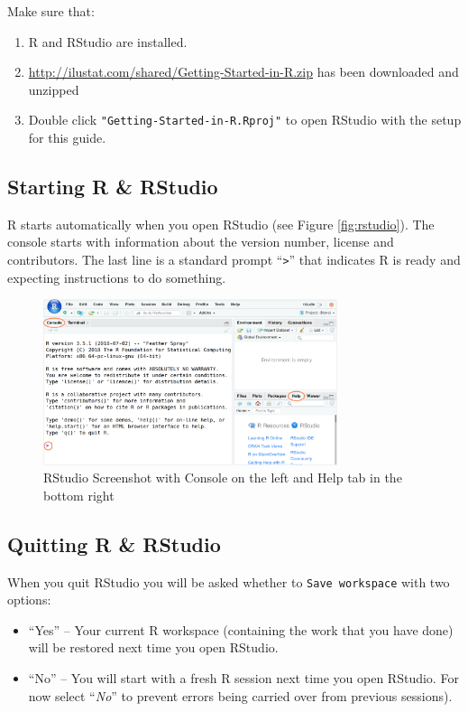 \documentclass[a4paper,9pt,twocolumn,twoside,printwatermark=false]{pinp}
\providecommand{\tightlist}{%
  \setlength{\itemsep}{0pt}\setlength{\parskip}{0pt}}
\begin{document}
Make sure that:

\begin{enumerate}
\def\labelenumi{\arabic{enumi}.}
\tightlist
\item
  R and RStudio are installed.
\item
  \url{http://ilustat.com/shared/Getting-Started-in-R.zip} has been
  downloaded and unzipped
\item
  Double click \texttt{"Getting-Started-in-R.Rproj"} to open RStudio
  with the setup for this guide.
\end{enumerate}

\subsection{Starting R \& RStudio}\label{starting-r-rstudio}

R starts automatically when you open RStudio (see Figure
\ref{fig:rstudio}). The console starts with information about the
version number, license and contributors. The last line is a standard
prompt ``\texttt{\textgreater{}}'' that indicates R is ready and
expecting instructions to do something.

\begin{figure}[H]

{\centering \includegraphics[width=3.4in]{RStudio-Screenshot} 

}

\caption{\label{fig:rstudio}RStudio Screenshot with Console on the left and  Help tab in the bottom right}\label{fig:RStudioScreenshot}
\end{figure}

\subsection{Quitting R \& RStudio}\label{quitting-r-rstudio}

When you quit RStudio you will be asked whether to
\texttt{Save\ workspace} with two options:

\begin{itemize}
\tightlist
\item
  ``Yes'' -- Your current R workspace (containing the work that you have
  done) will be restored next time you open RStudio.
\item
  ``No'' -- You will start with a fresh R session next time you open
  RStudio. For now select ``\emph{No}'' to prevent errors being carried
  over from previous sessions).
\end{itemize}
\end{document}
